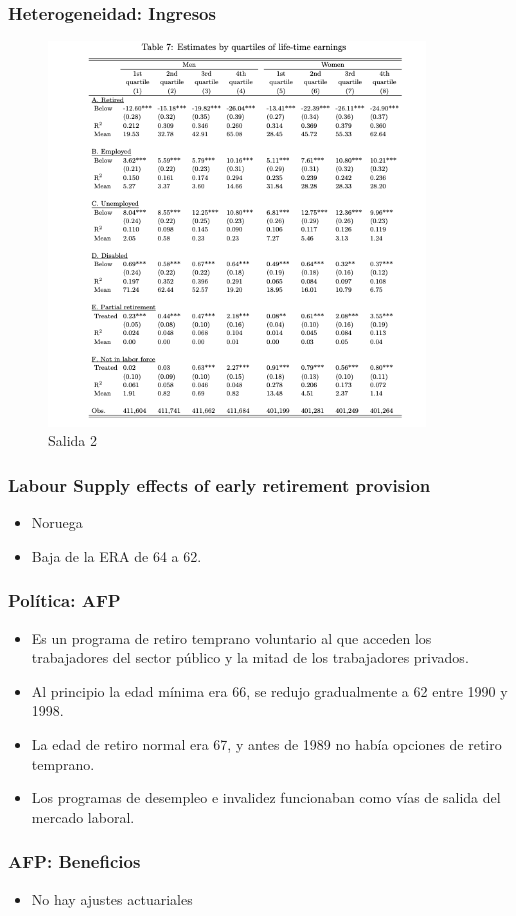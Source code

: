 \documentclass{beamer}
\begin{document}
  \frame
    {
    \frametitle{Heterogeneidad: Ingresos}
      \begin{figure}[htp]
        \centering
        \includegraphics[width=10cm]{imgs/staubli-tab7}
        \caption{Salida 2}
        \label{fig:fig2}
      \end{figure}
  }
  

  \frame
   {
     \frametitle{Labour Supply effects of early retirement provision}
     \begin{itemize}
     \item Noruega
     \item Baja de la ERA de 64 a 62. 
     \end{itemize}
   }

       \frame
           {
             \frametitle{Política: AFP}
             \begin{itemize}
             \item Es un programa de retiro temprano voluntario al que acceden los trabajadores del sector público y la mitad de los trabajadores privados.
             \item Al principio la edad mínima era 66, se redujo gradualmente a 62 entre 1990 y 1998.
             \item La edad de retiro normal era 67, y antes de 1989 no había opciones de retiro temprano.
             \item Los programas de desempleo e invalidez funcionaban como vías de salida del mercado laboral.

             \end{itemize}
           }
      \frame
           {
             \frametitle{AFP: Beneficios}
             \begin{itemize}
             \item No hay ajustes actuariales
             \end{itemize}
           }
           
\end{document}

